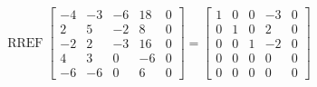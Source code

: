 \begin{exerciseAnswer} 


\[\operatorname{RREF} \left[\begin{array}{cccc|c}
-4 & -3 & -6 & 18 & 0 \\
2 & 5 & -2 & 8 & 0 \\
-2 & 2 & -3 & 16 & 0 \\
4 & 3 & 0 & -6 & 0 \\
-6 & -6 & 0 & 6 & 0
\end{array}\right] = \left[\begin{array}{cccc|c}
1 & 0 & 0 & -3 & 0 \\
0 & 1 & 0 & 2 & 0 \\
0 & 0 & 1 & -2 & 0 \\
0 & 0 & 0 & 0 & 0 \\
0 & 0 & 0 & 0 & 0
\end{array}\right] \]



\end{exerciseAnswer}

